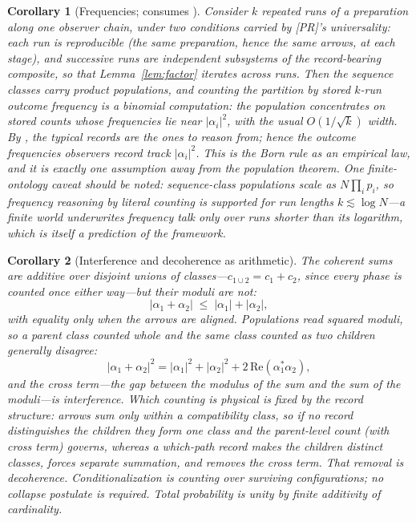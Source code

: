 \documentclass[11pt]{article}
\newtheorem{corollary}{Corollary}
\theoremstyle{definition}
\theoremstyle{remark}
\begin{document}
\begin{corollary}[Frequencies; consumes {\upshape[T]}]\label{cor:freq}
Consider $k$ repeated runs of a preparation along one observer chain, under two conditions carried by [PR]'s universality: each run is reproducible (the same preparation, hence the same arrows, at each stage), and successive runs are independent subsystems of the record-bearing composite, so that Lemma~\ref{lem:factor} iterates across runs. Then the sequence classes carry product populations, and counting the partition by stored $k$-run outcome frequency is a binomial computation: the population concentrates on stored counts whose frequencies lie near $|\alpha_i|^2$, with the usual $O(1/\sqrt{k})$ width. By {\upshape[T]}, the typical records are the ones to reason from; hence the outcome frequencies observers record track $|\alpha_i|^2$. This is the Born rule as an empirical law, and it is exactly one assumption away from the population theorem. One finite-ontology caveat should be noted: sequence-class populations scale as $N \prod_i p_i$, so frequency reasoning by literal counting is supported for run lengths $k \lesssim \log N$---a finite world underwrites frequency talk only over runs shorter than its logarithm, which is itself a prediction of the framework.
\end{corollary}

\begin{corollary}[Interference and decoherence as arithmetic]\label{cor:idc}
The coherent sums are additive over disjoint unions of classes---$c_{1 \cup 2} = c_1 + c_2$, since every phase is counted once either way---but their moduli are not:
\[ |\alpha_1 + \alpha_2| \;\le\; |\alpha_1| + |\alpha_2|, \]
with equality only when the arrows are aligned. Populations read squared moduli, so a parent class counted whole and the same class counted as two children generally disagree:
\[ |\alpha_1 + \alpha_2|^2 = |\alpha_1|^2 + |\alpha_2|^2 + 2\,\mathrm{Re}(\alpha_1^* \alpha_2), \]
and the cross term---the gap between the modulus of the sum and the sum of the moduli---is interference. Which counting is physical is fixed by the record structure: arrows sum only within a compatibility class, so if no record distinguishes the children they form one class and the parent-level count (with cross term) governs, whereas a which-path record makes the children distinct classes, forces separate summation, and removes the cross term. That removal is decoherence. Conditionalization is counting over surviving configurations; no collapse postulate is required. Total probability is unity by finite additivity of cardinality.
\end{corollary}
\end{document}
